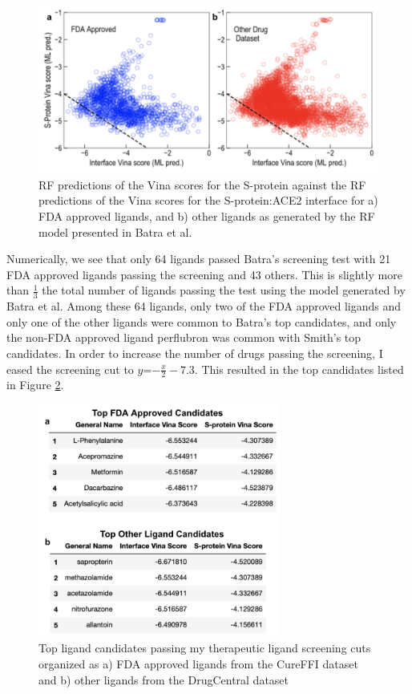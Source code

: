 \documentclass[11pt]{article}
\begin{document}
   \begin{figure}
     \centering
     \includegraphics[width=120mm]{batrascreening}
     \caption{RF predictions of the Vina scores for the S-protein against the RF predictions of the Vina scores for the S-protein:ACE2 interface for a) FDA approved ligands, and b) other ligands as generated by the RF model presented in Batra et al.}
     \label{fig:batraScreen}
   \end{figure} 
   
  Numerically, we see that only 64 ligands passed Batra's screening test with 21 FDA approved ligands passing the screening and 43 others. This is slightly more than $\frac{1}{3}$ the total number of ligands passing the test using the model generated by Batra et al. Among these 64 ligands, only two of the FDA approved ligands and only one of the other ligands were common to Batra's top candidates, and only the non-FDA approved ligand perflubron was common with Smith's top candidates. In order to increase the number of drugs passing the screening, I eased the screening cut to $y$=$-\frac{x}{2} - 7.3$. This resulted in the top candidates listed in Figure \ref{fig:topcandidates}.
  
  \begin{figure}
     \centering
     \includegraphics[width=80mm]{topcandidates}
     \caption{Top ligand candidates passing my therapeutic ligand screening cuts organized as a) FDA approved ligands from the CureFFI dataset and b) other ligands from the DrugCentral dataset \cite{cureffi,drugcentral}}
     \label{fig:topcandidates}
   \end{figure}
   
\end{document}
